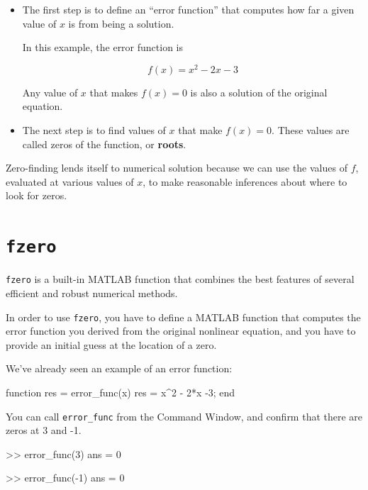 \documentclass[
]{book}
\numberwithin{Answer}{chapter}
\numberwithin{Exercise}{chapter}
\begin{document}
\begin{itemize}

\item The first step is to define an ``error function'' that computes how far
a given value of $x$ is from being a solution.

In this example, the error function is

\begin{equation}
f(x) = x^2 - 2x -3
\end{equation}

Any value of $x$ that makes $f(x) = 0$ is also a solution
of the original equation.

\item The next step is to find values of $x$ that make
$f(x) = 0$.  These values are called zeros of the
function, or {\bf roots}.

\end{itemize}

Zero-finding lends itself to numerical solution because we can
use the values of $f$, evaluated at various values of $x$, to
make reasonable inferences about where to look for zeros.



\section{{\tt fzero}}
\label{sect:fzero}

{\tt fzero} is a built-in MATLAB function that
combines the best features of several efficient and robust
numerical methods.

In order to use {\tt fzero}, you have to define a MATLAB function
that computes the error function you derived from the original
nonlinear equation, and you have to provide an initial guess at
the location of a zero.

We've already seen an example of an error function:

\begin{code}
function res = error_func(x)
    res = x^2 - 2*x -3;
end
\end{code}

You can call {\tt error\_func} from the {\sf Command Window}, and
confirm that there are zeros at 3 and -1.

\begin{code}
>> error_func(3)
ans = 0

>> error_func(-1)
ans = 0
\end{code}
\end{document}
